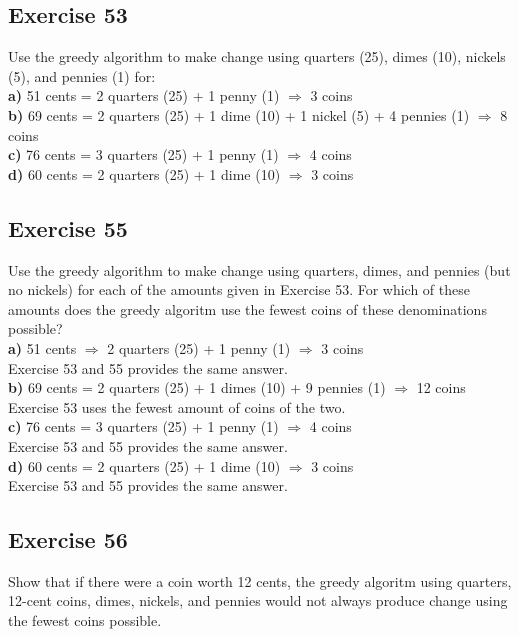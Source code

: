 \documentclass[12pt]{article}
\begin{document}
    \subsection{Exercise 53}
    Use the greedy algorithm to make change using quarters (25), dimes (10), nickels (5), and pennies (1) for\label{e:53}:\\
    \textbf{a)} 51 cents = 2 quarters (25) + 1 penny (1) $\Rightarrow$ 3 coins\\
    \textbf{b)} 69 cents = 2 quarters (25) + 1 dime (10) + 1 nickel (5) + 4 pennies (1) $\Rightarrow$ 8 coins\\
    \textbf{c)} 76 cents = 3 quarters (25) + 1 penny (1) $\Rightarrow$ 4 coins\\
    \textbf{d)} 60 cents = 2 quarters (25) + 1 dime (10) $\Rightarrow$ 3 coins

    \subsection{Exercise 55 }
    Use the greedy algorithm to make change using quarters, dimes, and pennies (but no nickels) for each of the amounts given in Exercise 53. For which of these amounts does the greedy algoritm use the fewest coins of these denominations possible?\label{e:55}\\
    \textbf{a)} 51 cents $\Rightarrow$ 2 quarters (25) + 1 penny (1) $\Rightarrow$ 3 coins\\
     Exercise 53 and 55 provides the same answer.\\
    \textbf{b)} 69 cents = 2 quarters (25) + 1 dimes (10) + 9 pennies (1) $\Rightarrow$ 12 coins\\
    Exercise 53 uses the fewest amount of coins of the two.\\
    \textbf{c)} 76 cents = 3 quarters (25) + 1 penny (1) $\Rightarrow$ 4 coins\\
    Exercise 53 and 55 provides the same answer.\\
    \textbf{d)} 60 cents = 2 quarters (25) + 1 dime (10) $\Rightarrow$ 3 coins\\
    Exercise 53 and 55 provides the same answer.

    \subsection{Exercise 56}
    Show that if there were a coin worth 12 cents, the greedy algoritm using quarters, 12-cent coins, dimes, nickels, and pennies would not always produce change using the fewest coins possible.
\end{document}
